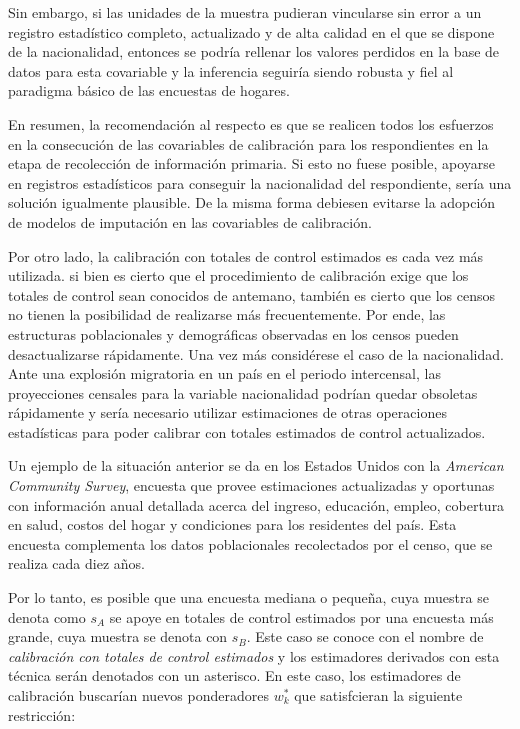\documentclass[
  12pt,
  spanish,
]{book}
\begin{document}
Sin embargo, si las unidades de la muestra pudieran vincularse sin error a un registro estadístico completo, actualizado y de alta calidad en el que se dispone de la nacionalidad, entonces se podría rellenar los valores perdidos en la base de datos para esta covariable y la inferencia seguiría siendo robusta y fiel al paradigma básico de las encuestas de hogares.

En resumen, la recomendación al respecto es que se realicen todos los esfuerzos en la consecución de las covariables de calibración para los respondientes en la etapa de recolección de información primaria. Si esto no fuese posible, apoyarse en registros estadísticos para conseguir la nacionalidad del respondiente, sería una solución igualmente plausible. De la misma forma debiesen evitarse la adopción de modelos de imputación en las covariables de calibración.

Por otro lado, la calibración con totales de control estimados es cada vez más utilizada. si bien es cierto que el procedimiento de calibración exige que los totales de control sean conocidos de antemano, también es cierto que los censos no tienen la posibilidad de realizarse más frecuentemente. Por ende, las estructuras poblacionales y demográficas observadas en los censos pueden desactualizarse rápidamente. Una vez más considérese el caso de la nacionalidad. Ante una explosión migratoria en un país en el periodo intercensal, las proyecciones censales para la variable nacionalidad podrían quedar obsoletas rápidamente y sería necesario utilizar estimaciones de otras operaciones estadísticas para poder calibrar con totales estimados de control actualizados.

Un ejemplo de la situación anterior se da en los Estados Unidos con la \emph{American Community Survey}, encuesta que provee estimaciones actualizadas y oportunas con información anual detallada acerca del ingreso, educación, empleo, cobertura en salud, costos del hogar y condiciones para los residentes del país. Esta encuesta complementa los datos poblacionales recolectados por el censo, que se realiza cada diez años.

Por lo tanto, es posible que una encuesta mediana o pequeña, cuya muestra se denota como \(s_A\) se apoye en totales de control estimados por una encuesta más grande, cuya muestra se denota con \(s_B\). Este caso se conoce con el nombre de \emph{calibración con totales de control estimados} \citep{Dever2008} y los estimadores derivados con esta técnica serán denotados con un asterisco. En este caso, los estimadores de calibración buscarían nuevos ponderadores \(w_k^*\) que satisfcieran la siguiente restricción:
\end{document}
